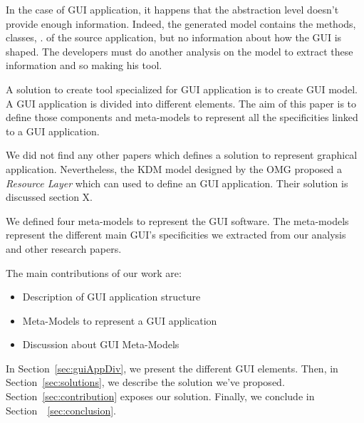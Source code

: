 \documentclass[conference]{IEEEtran}
\begin{document}
In the case of GUI application, it happens that the abstraction level doesn't provide enough information.
Indeed, the generated model contains the methods, classes, \etc. of the source application,
    but no information about how the GUI is shaped.
The developers must do another analysis on the model to extract these information and so
    making his tool.

A solution to create tool specialized for GUI application is to create GUI model.
A GUI application is divided into different elements.
The aim of this paper is to define those components and meta-models
    to represent all the specificities linked to a GUI application.

We did not find any other papers which defines a solution to represent graphical application.
Nevertheless, the KDM model designed by the OMG proposed a \textit{Resource Layer} which can used to define an GUI application.
Their solution is discussed section X.

We defined four meta-models to represent the GUI software.
The meta-models represent the different main GUI's specificities we extracted from our analysis
    and other research papers.

The main contributions of our work are: 

\begin{itemize}
    
    \item Description of GUI application structure

    \item Meta-Models to represent a GUI application

    \item Discussion about GUI Meta-Models

\end{itemize}

In Section~\ref{sec:guiAppDiv}, we present the different GUI elements. 
Then, in Section~\ref{sec:solutions}, we describe the solution we've proposed.
Section~\ref{sec:contribution} exposes our solution.
Finally, we conclude in Section~~\ref{sec:conclusion}.
\end{document}

